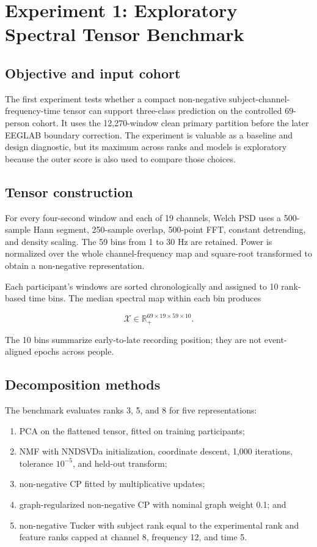 \chapter{Experiment 1: Exploratory Spectral Tensor Benchmark}
\label{ch:v1}

\section{Objective and input cohort}

The first experiment tests whether a compact non-negative
subject-channel-frequency-time tensor can support three-class prediction on the
controlled 69-person cohort. It uses the 12,270-window clean primary partition
before the later EEGLAB boundary correction. The experiment is valuable as a
baseline and design diagnostic, but its maximum across ranks and models is
exploratory because the outer score is also used to compare those choices.

\section{Tensor construction}

For every four-second window and each of 19 channels, Welch PSD uses a 500-sample
Hann segment, 250-sample overlap, 500-point FFT, constant detrending, and density
scaling. The 59 bins from 1 to 30 Hz are retained. Power is normalized over the
whole channel-frequency map and square-root transformed to obtain a non-negative
representation.

Each participant's windows are sorted chronologically and assigned to 10
rank-based time bins. The median spectral map within each bin produces

\begin{equation}
\mathcal{X}\in\mathbb{R}_{+}^{69\times19\times59\times10}.
\end{equation}

The 10 bins summarize early-to-late recording position; they are not event-
aligned epochs across people.

\section{Decomposition methods}

The benchmark evaluates ranks 3, 5, and 8 for five representations:

\begin{enumerate}
  \item PCA on the flattened tensor, fitted on training participants;
  \item NMF with NNDSVDa initialization, coordinate descent, 1,000 iterations,
  tolerance $10^{-5}$, and held-out transform;
  \item non-negative CP fitted by multiplicative updates;
  \item graph-regularized non-negative CP with nominal graph weight 0.1; and
  \item non-negative Tucker with subject rank equal to the experimental rank and
  feature ranks capped at channel 8, frequency 12, and time 5.
\end{enumerate}

